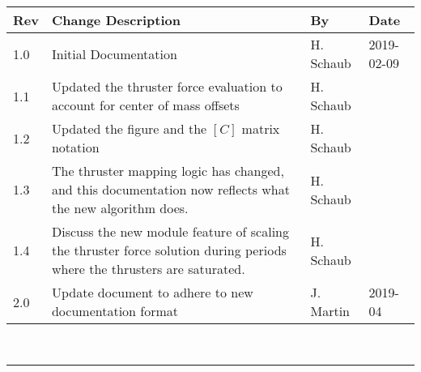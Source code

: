 \documentclass[]{BasiliskReportMemo}
\begin{document}
\makeCover
%
%
\pagestyle{empty}
{\renewcommand{\arraystretch}{2}
\noindent
\begin{longtable}{|p{0.5in}|p{3.5in}|p{1.07in}|p{0.9in}|}
\hline
{\bfseries Rev} & {\bfseries Change Description} & {\bfseries By}& {\bfseries Date} \\
\hline
1.0 & Initial Documentation & H. Schaub & 2019-02-09\\
\hline
1.1 & Updated the thruster force evaluation to account for center of mass offsets & H. Schaub & \\
\hline
1.2 & Updated the figure and the $[C]$ matrix notation & H. Schaub & \\
\hline
1.3 & The thruster mapping logic has changed, and this documentation now reflects what the new algorithm does. & H. Schaub & \\
\hline
1.4 & Discuss the new module feature of scaling the thruster force solution during periods where the thrusters are saturated. & H. Schaub & \\
\hline
2.0 & Update document to adhere to new documentation format & J. Martin & 2019-04 \\
\hline

\end{longtable}
}



\newpage
\setcounter{page}{1}
\pagestyle{fancy}

\tableofcontents %
~\\ \hrule ~\\ %



	





\end{document}
